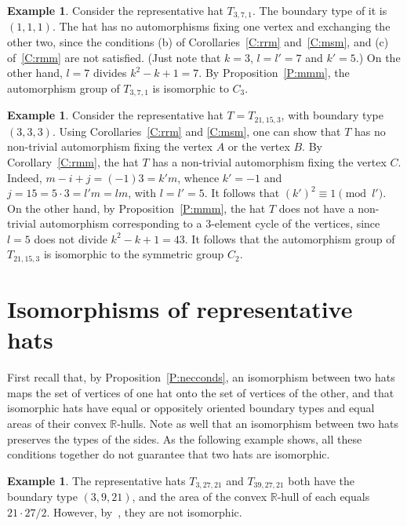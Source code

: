 \documentclass[12pt]{amsart}
\def\mbR{\mathbb{R}}
\theoremstyle{plain}
\theoremstyle{definition}
\newtheorem{example}[theorem]{Example}
\numberwithin{equation}{section}
\begin{document}
\begin{example}\label{Ex:mmm1}
Consider the representative hat $T_{3,7,1}$. The boundary type of it is $(1,1,1)$. The hat has
no automorphisms fixing one vertex and exchanging the other two, since the conditions (b) of
Corollaries~\ref{C:rrm} and~\ref{C:msm}, and (c) of~\ref{C:rmm} are not satisfied. (Just note
that  $k = 3$, $l = l' = 7$ and $k' = 5$.) On the other hand, $l = 7$ divides  $k^2 -k + 1 = 7$. By Proposition~\ref{P:mmm}, the automorphism group of $T_{3,7,1}$ is isomorphic to $C_3$.
\end{example}



\begin{example}\label{Ex:mmm2}
Consider the representative hat $T = T_{21,15,3}$, with boundary type $(3,3,3)$. Using
Corollaries~\ref{C:rrm} and \ref{C:msm}, one can show that $T$ has no non-trivial automorphism
fixing the vertex $A$ or the vertex $B$.  By Corollary~\ref{C:rmm}, the hat $T$ has a
non-trivial automorphism fixing the vertex $C$. Indeed, $m-i+j = (-1)3 = k'm$, whence $k'= -1$
and $j = 15 = 5\cdot3 = l'm = lm$, with $l = l' = 5$. It follows that $(k')^2 \equiv 1
\pmod{l'}$. On the other hand, by Proposition~\ref{P:mmm}, the hat $T$ does not have a
non-trivial automorphism corresponding to a $3$-element cycle of the vertices, since $l = 5$
does not divide $k^2-k+1 = 43$. It follows that the automorphism group of $T_{21,15,3}$ is
isomorphic to the symmetric group $C_2$.
\end{example}



\section{Isomorphisms of representative hats}\label{S:isomorphisms}


First recall that, by Proposition~\ref{P:necconds}, an isomorphism
between two hats maps the set of vertices of one hat onto the set of vertices of the other, and that isomorphic hats have equal or oppositely
oriented boundary types and equal areas of their convex $\mbR$-hulls. Note as well that an
isomorphism between two hats preserves the types of the sides.
As the following example shows, all these conditions together do not guarantee that two hats are isomorphic.


\begin{example}
The representative hats $T_{3,27,21}$ and $T_{39,27,21}$ both have the boundary type $(3,9,21)$, and the area of the convex $\mbR$-hull of each equals $21\cdot27/2$.
However, by~\cite[Prop.~5.1]{MR25},
they are not isomorphic.
\end{example}
\end{document}
